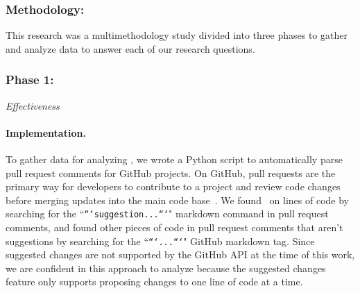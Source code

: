         

\subsubsection{Methodology:} This research was a multimethodology study divided into three phases to gather and analyze data to answer each of our research questions. \\

\subsubsection{Phase 1:} \textit{Effectiveness}

\paragraph{Implementation.}

To gather data for analyzing \SUGGS, we wrote a Python script to automatically parse pull request comments for GitHub projects. On GitHub, pull requests are the primary way for developers to contribute to a project and review code changes before merging updates into the main code base~\cite{gousios2014pullrequests}. We found \SUGGS~on lines of code by searching for the ``\texttt{```suggestion...```}" markdown command  in pull request comments, and found other pieces of code in pull request comments that aren't suggestions by searching for the ``\texttt{```...```}" GitHub markdown tag. Since suggested changes are not supported by the GitHub API at the time of this work, we are confident in this approach to analyze \SUGGS because the suggested changes feature only supports proposing changes to one line of code at a time.

